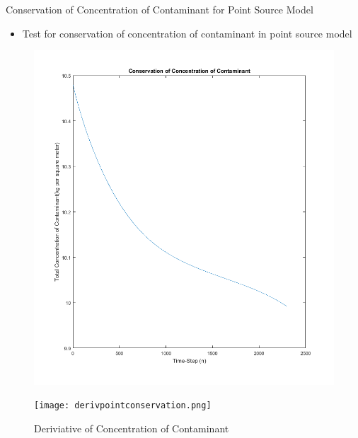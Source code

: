 \documentclass[10pt]{beamer}
\begin{document}
\begin{frame}{Conservation of Concentration of Contaminant for Point Source Model} \label{PointConservation}

\begin{itemize}
\item Test for conservation of concentration of contaminant in point source model
\end{itemize}

\begin{figure}   
\begin{minipage}[b]{0.4\textwidth}
   \includegraphics[trim=0mm 0mm 0mm 0mm,clip,width=1\linewidth]{pointconservation.png}
\caption{Conservation of Concentration of Contaminant}
\end{minipage}
 \begin{minipage}[b]{0.4\textwidth}
   \texttt{[image: derivpointconservation.png]}
\caption{Deriviative of Concentration of Contaminant}
\end{minipage}
\end{figure}
\hyperlink{Questions}{}
\end{frame}
\end{document}
